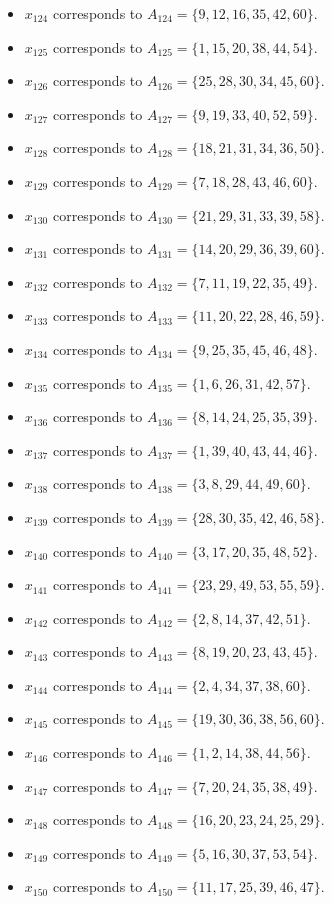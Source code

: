 \documentclass[11pt]{article}
\begin{document}
\begin{itemize}
\item $x_{124}$ corresponds to $A_{124}=\{9, 12, 16, 35, 42, 60\}$.
\item $x_{125}$ corresponds to $A_{125}=\{1, 15, 20, 38, 44, 54\}$.
\item $x_{126}$ corresponds to $A_{126}=\{25, 28, 30, 34, 45, 60\}$.
\item $x_{127}$ corresponds to $A_{127}=\{9, 19, 33, 40, 52, 59\}$.
\item $x_{128}$ corresponds to $A_{128}=\{18, 21, 31, 34, 36, 50\}$.
\item $x_{129}$ corresponds to $A_{129}=\{7, 18, 28, 43, 46, 60\}$.
\item $x_{130}$ corresponds to $A_{130}=\{21, 29, 31, 33, 39, 58\}$.
\item $x_{131}$ corresponds to $A_{131}=\{14, 20, 29, 36, 39, 60\}$.
\item $x_{132}$ corresponds to $A_{132}=\{7, 11, 19, 22, 35, 49\}$.
\item $x_{133}$ corresponds to $A_{133}=\{11, 20, 22, 28, 46, 59\}$.
\item $x_{134}$ corresponds to $A_{134}=\{9, 25, 35, 45, 46, 48\}$.
\item $x_{135}$ corresponds to $A_{135}=\{1, 6, 26, 31, 42, 57\}$.
\item $x_{136}$ corresponds to $A_{136}=\{8, 14, 24, 25, 35, 39\}$.
\item $x_{137}$ corresponds to $A_{137}=\{1, 39, 40, 43, 44, 46\}$.
\item $x_{138}$ corresponds to $A_{138}=\{3, 8, 29, 44, 49, 60\}$.
\item $x_{139}$ corresponds to $A_{139}=\{28, 30, 35, 42, 46, 58\}$.
\item $x_{140}$ corresponds to $A_{140}=\{3, 17, 20, 35, 48, 52\}$.
\item $x_{141}$ corresponds to $A_{141}=\{23, 29, 49, 53, 55, 59\}$.
\item $x_{142}$ corresponds to $A_{142}=\{2, 8, 14, 37, 42, 51\}$.
\item $x_{143}$ corresponds to $A_{143}=\{8, 19, 20, 23, 43, 45\}$.
\item $x_{144}$ corresponds to $A_{144}=\{2, 4, 34, 37, 38, 60\}$.
\item $x_{145}$ corresponds to $A_{145}=\{19, 30, 36, 38, 56, 60\}$.
\item $x_{146}$ corresponds to $A_{146}=\{1, 2, 14, 38, 44, 56\}$.
\item $x_{147}$ corresponds to $A_{147}=\{7, 20, 24, 35, 38, 49\}$.
\item $x_{148}$ corresponds to $A_{148}=\{16, 20, 23, 24, 25, 29\}$.
\item $x_{149}$ corresponds to $A_{149}=\{5, 16, 30, 37, 53, 54\}$.
\item $x_{150}$ corresponds to $A_{150}=\{11, 17, 25, 39, 46, 47\}$.
\end{itemize}
\end{document}
